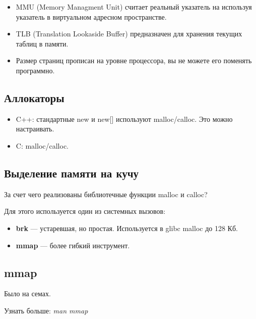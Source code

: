 \begin{itemize}
	\item MMU (Memory Managment Unit) считает реальный указатель на используя указатель
	в виртуальном адресном пространстве.
	\item TLB (Translation Lookaside Buffer) предназначен для хранения текущих 
	таблиц в памяти.
	\item Размер страниц прописан на уровне процессора, вы не можете его поменять программно.
\end{itemize}

\subsection{Аллокаторы}

\begin{itemize}
	\item C++: стандартные new и new[] используют malloc/calloc. Это можно настраивать.
	\item C: malloc/calloc.
\end{itemize}

\subsection{Выделение памяти на кучу}

За счет чего реализованы библиотечные функции malloc и calloc?

Для этого используется один из системных вызовов:
\begin{itemize}
	\item \textbf{brk} --- устаревшая, но простая. Используется в glibc malloc до 128 Кб.
	\item \textbf{mmap} --- более гибкий инструмент.
\end{itemize}

\subsection{mmap}

Было на семах. 

Узнать больше: \textit{man mmap}

\subsection{}




